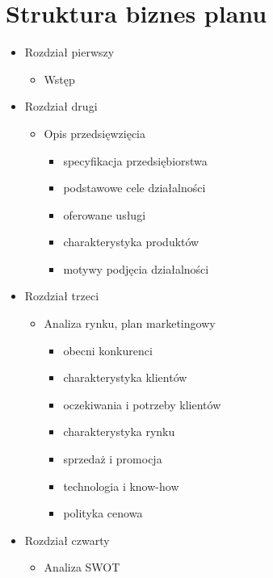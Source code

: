 \documentclass[
12pt, %
a4paper
]{article}
\begin{document}
	\section{Struktura biznes planu}
	\begin{itemize}
		\item Rozdział pierwszy
			\begin{itemize}
				\item Wstęp
			\end{itemize}
			
		\item Rozdział drugi
			\begin{itemize}
				\item Opis przedsięwzięcia
					\begin{itemize}
						\item specyfikacja przedsiębiorstwa
						\item podstawowe cele działalności
						\item oferowane usługi
						\item charakterystyka produktów
						\item motywy podjęcia działalności
					\end{itemize}
			\end{itemize}
			
		\item Rozdział trzeci
			\begin{itemize}
				\item Analiza rynku, plan marketingowy
					\begin{itemize}
						\item obecni konkurenci
						\item charakterystyka klientów
						\item oczekiwania i potrzeby klientów
						\item charakterystyka rynku
						\item sprzedaż i promocja
						\item technologia i know-how
						\item polityka cenowa
					\end{itemize}
			\end{itemize}
			
		\item Rozdział czwarty
			\begin{itemize}
				\item Analiza SWOT
			\end{itemize}
			

\end{itemize}
\end{document}
